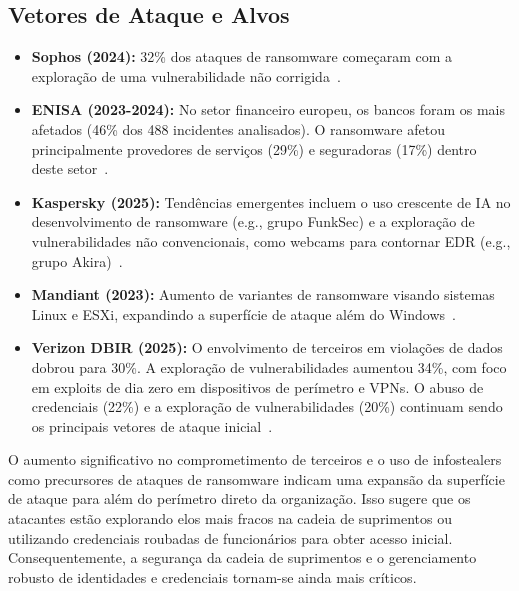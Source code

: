 \subsection{Vetores de Ataque e Alvos}
\begin{itemize}
    \item \textbf{Sophos (2024):} 32\% dos ataques de ransomware começaram com a exploração de uma vulnerabilidade não corrigida~\cite{SophosStateOfRansomware2024}.
    \item \textbf{ENISA (2023-2024):} No setor financeiro europeu, os bancos foram os mais afetados (46\% dos 488 incidentes analisados). O ransomware afetou principalmente provedores de serviços (29\%) e seguradoras (17\%) dentro deste setor~\cite{ENISA_Threat_Landscape_Finance_2024}.
    \item \textbf{Kaspersky (2025):} Tendências emergentes incluem o uso crescente de IA no desenvolvimento de ransomware (e.g., grupo FunkSec) e a exploração de vulnerabilidades não convencionais, como webcams para contornar EDR (e.g., grupo Akira)~\cite{KasperskyRansomwareReport2025}.
    \item \textbf{Mandiant (2023):} Aumento de variantes de ransomware visando sistemas Linux e ESXi, expandindo a superfície de ataque além do Windows~\cite{MandiantGoogleCloudRansomware2023}.
    \item \textbf{Verizon DBIR (2025):} O envolvimento de terceiros em violações de dados dobrou para 30\%. A exploração de vulnerabilidades aumentou 34\%, com foco em exploits de dia zero em dispositivos de perímetro e VPNs. O abuso de credenciais (22\%) e a exploração de vulnerabilidades (20\%) continuam sendo os principais vetores de ataque inicial~\cite{VerizonDBIR2025}.
\end{itemize}

O aumento significativo no comprometimento de terceiros e o uso de infostealers como precursores de ataques de ransomware indicam uma expansão da superfície de ataque para além do perímetro direto da organização. Isso sugere que os atacantes estão explorando elos mais fracos na cadeia de suprimentos ou utilizando credenciais roubadas de funcionários para obter acesso inicial. Consequentemente, a segurança da cadeia de suprimentos e o gerenciamento robusto de identidades e credenciais tornam-se ainda mais críticos.

